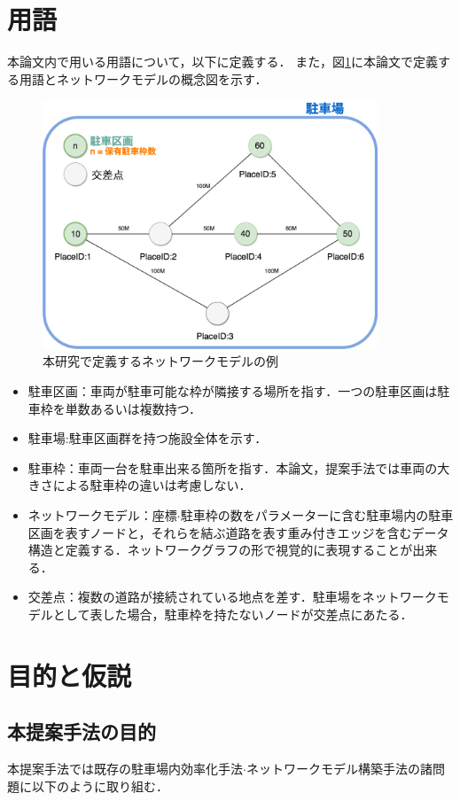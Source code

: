 \section{用語}
本論文内で用いる用語について，以下に定義する．
また，図\ref{networkmodel-example}に本論文で定義する用語とネットワークモデルの概念図を示す．
\begin{figure}
	\centering
	\includegraphics[width=10cm]{fig/networkmodel.png}
	\caption{本研究で定義するネットワークモデルの例}
	\label{networkmodel-example}
\end{figure}
\begin{itemize}
	\item 駐車区画：車両が駐車可能な枠が隣接する場所を指す．一つの駐車区画は駐車枠を単数あるいは複数持つ．
	\item 駐車場:駐車区画群を持つ施設全体を示す．
	\item 駐車枠：車両一台を駐車出来る箇所を指す．本論文，提案手法では車両の大きさによる駐車枠の違いは考慮しない．
	\item ネットワークモデル：座標$\cdot$駐車枠の数をパラメーターに含む駐車場内の駐車区画を表すノードと，それらを結ぶ道路を表す重み付きエッジを含むデータ構造と定義する．ネットワークグラフの形で視覚的に表現することが出来る．
	\item 交差点：複数の道路が接続されている地点を差す．駐車場をネットワークモデルとして表した場合，駐車枠を持たないノードが交差点にあたる．
\end{itemize}


\section{目的と仮説}
\label{purpose-proposal}
\subsection{本提案手法の目的}
本提案手法では既存の駐車場内効率化手法$\cdot$ネットワークモデル構築手法の諸問題に以下のように取り組む．

